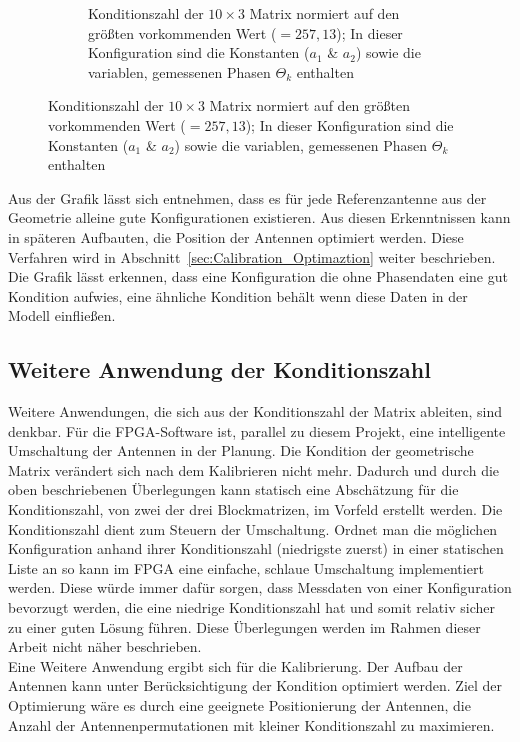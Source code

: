 \begin{figure}[h!]
\begin{subfigure}[t]{0.45\textwidth}
                 \caption{Konditionszahl der $10\times3$ Matrix normiert auf den größten vorkommenden Wert ($=257,13$); In dieser Konfiguration sind die Konstanten ($a_1$ \& $a_2$) sowie die variablen, gemessenen Phasen $\Theta_k$ enthalten}
                 \label{fig:AnalyzeOf10x3}
         \end{subfigure}
%
\end{figure}
%
Aus der Grafik lässt sich entnehmen, dass es für jede Referenzantenne aus der Geometrie alleine gute Konfigurationen existieren. Aus diesen Erkenntnissen kann in späteren Aufbauten, die Position der Antennen optimiert werden. Diese Verfahren wird in Abschnitt~\ref{sec:Calibration_Optimaztion} weiter beschrieben. Die Grafik lässt erkennen, dass eine Konfiguration die ohne Phasendaten eine gut Kondition aufwies, eine ähnliche Kondition behält wenn diese Daten in der Modell einfließen.
\\
%
\subsection{Weitere Anwendung der Konditionszahl}
Weitere Anwendungen, die sich aus der Konditionszahl der Matrix ableiten, sind denkbar. Für die FPGA-Software ist, parallel zu diesem Projekt, eine intelligente Umschaltung der Antennen in der Planung. Die Kondition der geometrische Matrix verändert sich nach dem Kalibrieren nicht mehr. Dadurch und durch die oben beschriebenen Überlegungen kann statisch eine Abschätzung für die Konditionszahl, von zwei der drei Blockmatrizen, im Vorfeld erstellt werden. Die Konditionszahl dient zum Steuern der Umschaltung. Ordnet man die möglichen Konfiguration anhand ihrer Konditionszahl (niedrigste zuerst) in einer statischen Liste an so kann im FPGA eine einfache, schlaue Umschaltung implementiert werden. Diese würde immer dafür sorgen, dass Messdaten von einer Konfiguration bevorzugt werden, die eine niedrige Konditionszahl hat und somit relativ sicher zu einer guten Lösung führen. Diese Überlegungen werden im Rahmen dieser Arbeit nicht näher beschrieben.\\
Eine Weitere Anwendung ergibt sich für die Kalibrierung. Der Aufbau der Antennen kann unter Berücksichtigung der Kondition optimiert werden. Ziel der Optimierung wäre es durch eine geeignete Positionierung der Antennen, die Anzahl der Antennenpermutationen mit kleiner Konditionszahl zu maximieren.